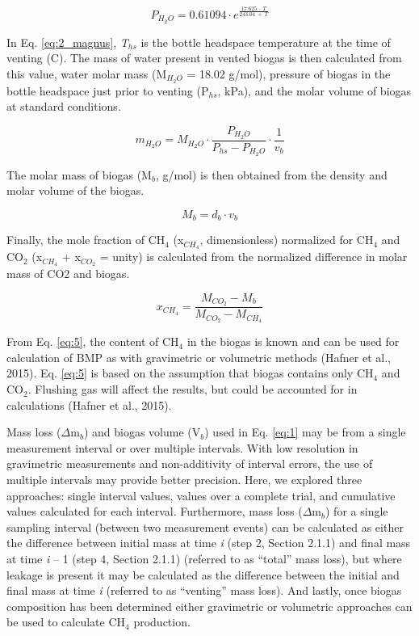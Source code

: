 \documentclass[]{article}
\begin{document}
\begin{equation}
\label{eq:2_magnus}
   P_{H_2O} = 0.61094 \cdot e^{\frac{17.625\ \cdot \ T}{243.04\ + \ T}}
\end{equation}

\noindent In Eq. \ref{eq:2_magnus}, \textit{T}$_{hs}$ is the bottle headspace temperature at the time of venting (\degree C). The mass of water present in vented biogas is then calculated from this value, water molar mass (M$_{H_2O}$ = 18.02 g/mol), pressure of biogas in the bottle headspace just prior to venting (P$_{hs}$, kPa), and the molar volume of biogas at standard conditions.

\begin{equation}
  \label{eq:3}
  m_{H_2O}=M_{H_2O} \cdot \frac{P_{H_2O}}{P_{hs}-P_{H_2O}} \cdot \frac{1}{v_b}
\end{equation}

\noindent The molar mass of biogas (M$_b$, g/mol) is then obtained from the density and molar volume of the biogas.

\begin{equation}
  \label{eq:4}
  M_b=d_b \cdot v_b
\end{equation}

\noindent Finally, the mole fraction of CH$_4$ (x$_{CH_4}$, dimensionless) normalized for CH$_4$ and CO$_2$ (x$_{CH_4}$ + x$_{CO_2}$ = unity) is calculated from the normalized difference in molar mass of CO2 and biogas.

\begin{equation}
  \label{eq:5}
  x_{CH_4}=\frac{M_{CO_2}-M_b}{M_{CO_2}-M_{CH_4}}
\end{equation}

	
\noindent From Eq. \ref{eq:5}, the content of CH$_4$ in the biogas is known and can be used for calculation of BMP as with gravimetric or volumetric methods (Hafner et al., 2015). Eq. \ref{eq:5} is based on the assumption that biogas contains only CH$_4$ and CO$_2$. Flushing gas will affect the results, but could be accounted for in calculations (Hafner et al., 2015).

Mass loss ($\Delta$m$_b$) and biogas volume (V$_b$) used in Eq. \ref{eq:1} may be from a single measurement interval or over multiple intervals. With low resolution in gravimetric measurements and non-additivity of interval errors, the use of multiple intervals may provide better precision. Here, we explored three approaches: single interval values, values over a complete trial, and cumulative values calculated for each interval. Furthermore, mass loss ($\Delta$m$_b$) for a single sampling interval (between two measurement events) can be calculated as either the difference between initial mass at time \textit{i} (step 2, Section 2.1.1) and final mass at time \textit{i} – 1 (step 4, Section 2.1.1) (referred to as “total” mass loss), but where leakage is present it may be calculated as the difference between the initial and final mass at time \textit{i} (referred to as “venting” mass loss). And lastly, once biogas composition has been determined either gravimetric or volumetric approaches can be used to calculate CH$_4$ production.
\end{document}
